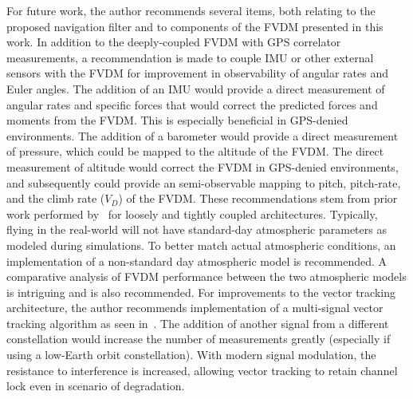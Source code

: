 For future work, the author recommends several items, both relating to the proposed navigation filter and to components of the FVDM presented in this work. In addition to the deeply-coupled FVDM with GPS correlator measurements, a recommendation is made to couple IMU or other external sensors with the FVDM for improvement in observability of angular rates and Euler angles. The addition of an IMU would provide a direct measurement of angular rates and specific forces that would correct the predicted forces and moments from the FVDM\@. This is especially beneficial in GPS-denied environments. The addition of a barometer would provide a direct measurement of pressure, which could be mapped to the altitude of the FVDM\@. The direct measurement of altitude would correct the FVDM in GPS-denied environments, and subsequently could provide an semi-observable mapping to pitch, pitch-rate, and the climb rate (\(V_D\)) of the FVDM\@. These recommendations stem from prior work performed by~\cite{khaghaniAssessmentVDMbasedAutonomous2018,khaghaniAutonomousVehicleDynamic2016,mwenegohaModelbasedTightlyCoupled2020} for loosely and tightly coupled architectures. Typically, flying in the real-world will not have standard-day atmospheric parameters as modeled during simulations.  To better match actual atmospheric conditions, an implementation of a non-standard day atmospheric model is recommended. A comparative analysis of FVDM performance between the two atmospheric models is intriguing and is also recommended. For improvements to the vector tracking architecture, the author recommends implementation of a multi-signal vector tracking algorithm as seen in~\cite{givhanGPSL5Software2021}. The addition of another signal from a different constellation would increase the number of measurements greatly (especially if using a low-Earth orbit constellation). With modern signal modulation, the resistance to interference is increased, allowing vector tracking to retain channel lock even in scenario of degradation. 